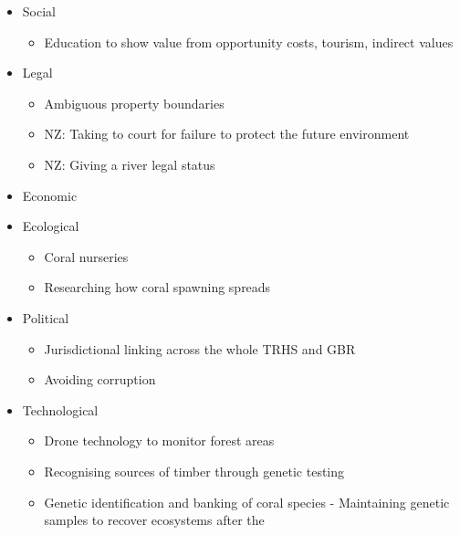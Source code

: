 	\begin{itemize}
		\item Social
			\begin{itemize}
				\item Education to show value from opportunity costs, tourism, indirect values
			\end{itemize}
		\item Legal
			\begin{itemize}
				\item Ambiguous property boundaries
				\item NZ: Taking to court for failure to protect the future environment
				\item NZ: Giving a river legal status
			\end{itemize}
		\item Economic
		\item Ecological
			\begin{itemize}
				\item Coral nurseries
				\item Researching how coral spawning spreads
			\end{itemize}
		\item Political
			\begin{itemize}
				\item Jurisdictional linking across the whole TRHS and GBR
				\item Avoiding corruption
			\end{itemize}
		\item Technological
			\begin{itemize}
				\item Drone technology to monitor forest areas
				\item Recognising sources of timber through genetic testing
				\item Genetic identification and banking of coral species - Maintaining genetic samples to recover ecosystems after the 
			\end{itemize}

	\end{itemize}


